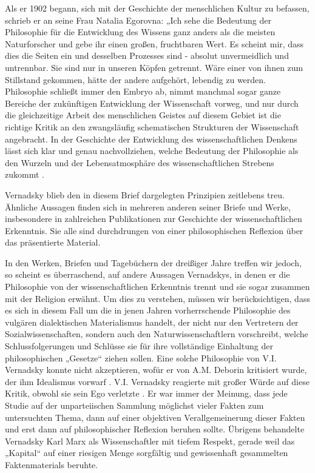 \documentclass[11pt,a4paper]{article}
\begin{document}
Als er 1902 begann, sich mit der Geschichte der menschlichen Kultur zu
befassen, schrieb er an seine Frau Natalia Egorovna: „Ich sehe die Bedeutung
der Philosophie für die Entwicklung des Wissens ganz anders als die meisten
Naturforscher und gebe ihr einen großen, fruchtbaren Wert. Es scheint mir,
dass dies die Seiten ein und desselben Prozesses sind - absolut unvermeidlich
und untrennbar. Sie sind nur in unseren Köpfen getrennt. Wäre einer von ihnen
zum Stillstand gekommen, hätte der andere aufgehört, lebendig zu werden.
Philosophie schließt immer den Embryo ab, nimmt manchmal sogar ganze Bereiche
der zukünftigen Entwicklung der Wissenschaft vorweg, und nur durch die
gleichzeitige Arbeit des menschlichen Geistes auf diesem Gebiet ist die
richtige Kritik an den zwangsläufig schematischen Strukturen der Wissenschaft
angebracht. In der Geschichte der Entwicklung des wissenschaftlichen Denkens
lässt sich klar und genau nachvollziehen, welche Bedeutung der Philosophie als
den Wurzeln und der Lebensatmosphäre des wissenschaftlichen Strebens
zukommt \cite[S. 21]{Mikulinsky1988}. 

Vernadsky blieb den in diesem Brief dargelegten Prinzipien zeitlebens treu.
Ähnliche Aussagen finden sich in mehreren anderen seiner Briefe und Werke,
insbesondere in zahlreichen Publikationen zur Geschichte der
wissenschaftlichen Erkenntnis. Sie alle sind durchdrungen von einer
philosophischen Reflexion über das präsentierte Material.

In den Werken, Briefen und Tagebüchern der dreißiger Jahre treffen wir jedoch,
so scheint es überraschend, auf andere Aussagen Vernadskys, in denen er die
Philosophie von der wissenschaftlichen Erkenntnis trennt und sie sogar
zusammen mit der Religion erwähnt. Um dies zu verstehen, müssen wir
berücksichtigen, dass es sich in diesem Fall um die in jenen Jahren
vorherrschende Philosophie des vulgären dialektischen Materialismus handelt,
der nicht nur den Vertretern der Sozialwissenschaften, sondern auch den
Naturwissenschaftlern vorschreibt, welche Schlussfolgerungen und Schlüsse sie
für ihre vollständige Einhaltung der philosophischen „Gesetze“ ziehen
sollen. Eine solche Philosophie von V.I. Vernadsky konnte nicht akzeptieren,
wofür er von A.M. Deborin kritisiert wurde, der ihm Idealismus vorwarf
\cite[S. 543-569]{Deborin1932}.  V.I. Vernadsky reagierte mit großer Würde auf
diese Kritik, obwohl sie sein Ego verletzte \cite[S. 395-407]{Vernadsky1933}.
Er war immer der Meinung, dass jede Studie auf der unparteiischen Sammlung
möglichst vieler Fakten zum untersuchten Thema, dann auf einer objektiven
Verallgemeinerung dieser Fakten und erst dann auf philosophischer Reflexion
beruhen sollte. Übrigens behandelte Vernadsky Karl Marx als Wissenschaftler
mit tiefem Respekt, gerade weil das „Kapital“ auf einer riesigen Menge
sorgfältig und gewissenhaft gesammelten Faktenmaterials beruhte.
\end{document}

